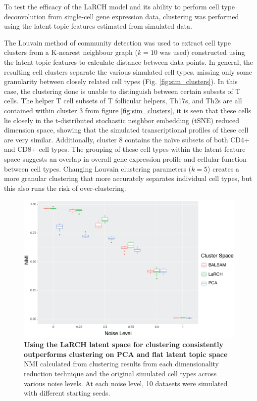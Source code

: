 To test the efficacy of the LaRCH model and its ability to perform cell type deconvolution from single-cell gene expression data, clustering was performed using the latent topic features estimated from simulated data. 

The Louvain method of community detection \cite{louvain} was used to extract cell type clusters from a K-nearest neighbour graph ($k = 10$ was used) constructed using the latent topic features to calculate distance between data points. In general, the resulting cell clusters separate the various simulated cell types, missing only some granularity between closely related cell types (Fig. \ref{fig:sim_clusters}). In this case, the clustering done is unable to distinguish between certain subsets of T cells. The helper T cell subsets of T follicular helpers, Th17s, and Th2s are all contained within cluster 3 from figure \ref{fig:sim_clusters}, it is seen that these cells lie closely in the t-distributed stochastic neighbor embedding (tSNE) reduced dimension space, showing that the simulated transcriptional profiles of these cell are very similar. Additionally, cluster 8 contains the naïve subsets of both CD4+ and CD8+ cell types. The grouping of these cell types within the latent feature space suggests an overlap in overall gene expression profile and cellular function between cell types. Changing Louvain clustering parameters ($k = 5$) creates a more granular clustering that more accurately separates individual cell types, but this also runs the risk of over-clustering. 

\begin{figure}
    \centering
    \includegraphics[width=\textwidth]{Figures/nmi_comp.png}
    \caption{\textbf{Using the LaRCH latent space for clustering consistently outperforms clustering on PCA and flat latent topic space} NMI calculated from clustering results from each dimensionality reduction technique and the original simulated cell types across various noise levels. At each noise level, 10 datasets were simulated with different starting seeds.}
    \label{fig:nmi}
\end{figure}

